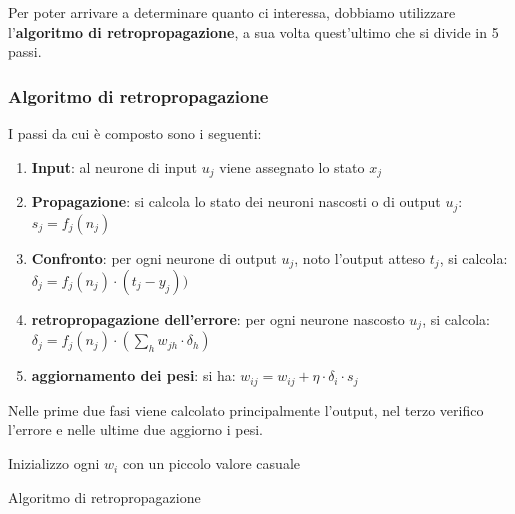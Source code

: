 Per poter arrivare a determinare quanto ci interessa, dobbiamo utilizzare l'\textbf{algoritmo di retropropagazione}, a sua volta quest'ultimo che si divide in 5 passi.

\subsubsection{Algoritmo di retropropagazione}
I passi da cui è composto sono i seguenti:
\begin{enumerate}
    \item \textbf{Input}: al neurone di input $u_j$ viene assegnato lo stato $x_j$
    \item \textbf{Propagazione}: si calcola lo stato dei neuroni nascosti o di output $u_j$: $s_j=f_j(n_j)$
    \item \textbf{Confronto}: per ogni neurone di output $u_j$, noto l’output atteso $t_j$, si calcola:  $\delta_j=f_j(n_j)\cdot(t_j-y_j))$
    \item \textbf{retropropagazione dell’errore}: per ogni neurone nascosto $u_j$, si calcola: $\displaystyle\delta_j=f_j(n_j)\cdot\left(\sum_h w_{jh}\cdot \delta_h\right)$
    \item \textbf{aggiornamento dei pesi}: si ha: $\displaystyle w_{ij}=w_{ij}+\eta\cdot \delta_i\cdot s_j$
\end{enumerate}
Nelle prime due fasi viene calcolato principalmente l'output, nel terzo verifico l'errore e nelle ultime due aggiorno i pesi.

\begin{algorithm}[H]
    \SetAlgoLined
    \textnormal{Inizializzo ogni} $w_i$ \textnormal{ con un piccolo valore casuale} \\
   \caption{Algoritmo di retropropagazione}
\end{algorithm}

